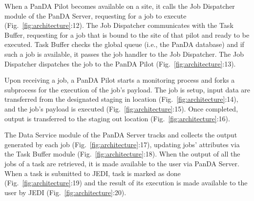
When a PanDA Pilot becomes available on a site, it
calls the Job Dispatcher module of the PanDA Server, requesting for a job to
execute (Fig.~\ref{fig:architecture}:12). The Job Dispatcher communicates with
the Task Buffer, requesting for a job that is bound to the site of that pilot
and ready to be executed. Task Buffer checks the global queue (i.e., the PanDA
database) and if such a job is available, it passes the job handler to the Job
Dispatcher. The Job Dispatcher dispatches the job to the PanDA Pilot
(Fig.~\ref{fig:architecture}:13).


Upon receiving a job, a PanDA Pilot starts a monitoring process and forks a
subprocess for the execution of the job's payload. The job is setup, input data
are transferred from the designated staging in location
(Fig.~\ref{fig:architecture}:14), and the job's payload is executed
(Fig.~\ref{fig:architecture}:15). Once completed, output is transferred to the
staging out location (Fig.~\ref{fig:architecture}:16).


The Data Service module of the PanDA Server tracks and collects the output
generated by each job (Fig.~\ref{fig:architecture}:17), updating jobs'
attributes via the Task Buffer module (Fig.~\ref{fig:architecture}:18). When the
output of all the jobs of a task are retrieved, it is made available to the user
via PanDA Server. When a task is submitted to JEDI, task is marked as done
(Fig.~\ref{fig:architecture}:19) and the result of its execution is made
available to the user by JEDI (Fig.~\ref{fig:architecture}:20).

